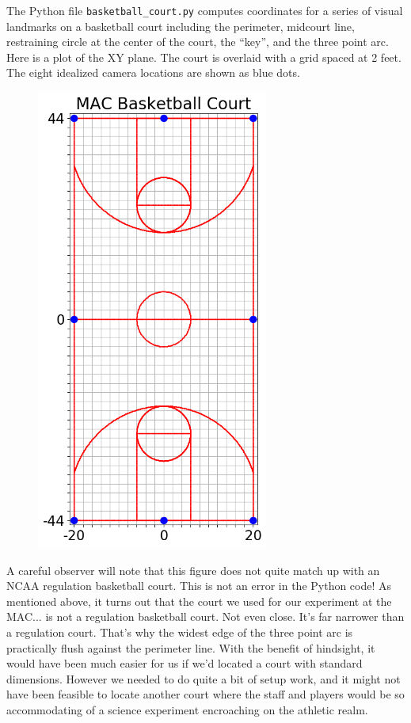 \documentclass{article}
\begin{document}
The Python file \texttt{basketball\_court.py} computes coordinates for a series of visual landmarks on a
basketball court including the perimeter, midcourt line, restraining circle at the center of the court,
the ``key'', and the three point arc.  Here is a plot of the XY plane.  
The court is overlaid with a grid spaced at 2 feet.  The eight idealized camera locations are shown as blue dots.
\begin{figure}[H]
\center
\includegraphics[width=0.68\textwidth]{court_lines.png}
\end{figure}

A careful observer will note that this figure does not quite match up with an NCAA regulation basketball court.
This is not an error in the Python code!  
As mentioned above, it turns out that the court we used for our experiment at the MAC...
is not a regulation basketball court.  Not even close.  It's far narrower than a regulation court.
That's why the widest edge of the three point arc is practically flush against the perimeter line.
With the benefit of hindsight, it would have been much easier for us if we'd located a court with standard dimensions.
However we needed to do quite a bit of setup work, and it might not have been feasible to locate another court
where the staff and players would be so accommodating of a science experiment encroaching on the athletic realm.
\end{document}
